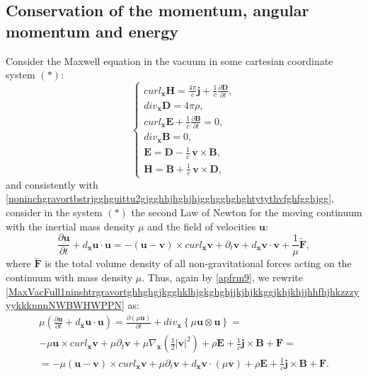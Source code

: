 \documentclass{article}
\theoremstyle{definition}
\theoremstyle{remark}
\renewcommand{\vec}[1]{\mathbf{#1}}
\newcommand{\er}{\eqref}
\newcommand{\er}{\eqref}
\begin{document}
\subsection{Conservation of the momentum, angular momentum and
energy} Consider the Maxwell equation in the vacuum in some
cartesian coordinate system $(*)$:
\begin{equation}\label{MaxVacFull1bjkgjhjhgjaaahkjhhjzzzyyykkknnnNWBWHWPPN}
\begin{cases}
curl_{\vec x} \vec H= \frac{4\pi}{c}\vec j+\frac{1}{c}\frac{\partial
\vec D}{\partial t},\\
div_{\vec x} \vec D= 4\pi\rho,\\
curl_{\vec x} \vec E+\frac{1}{c}\frac{\partial \vec B}{\partial t}=0,\\
div_{\vec x} \vec B=0,\\
\vec E=\vec D-\frac{1}{c}\,\vec v\times \vec B,\\
\vec H=\vec B+\frac{1}{c}\,\vec v\times \vec D,
\end{cases}
\end{equation}
and consistently with
\er{noninchgravortbstrjgghguittu2gjgghhjhghjhjgghgghghghtytythvfghfgghjgg},
consider in the system $(*)$ the second Law of Newton for the moving
continuum with the inertial mass density $\mu$ and the field of
velocities $\vec u$:
\begin{equation}\label{MaxVacFull1ninshtrgravortghhghgjkgghklhjgkghghjjkjhjkkggjkhjkhjjhhfhjhkzzzyyykkknnnNWBWHWPPN}
\frac{\partial\vec u}{\partial t}+d_{\vec x}\vec u\cdot \vec
u=-(\vec u-\vec v)\times curl_{\vec x}\vec v +\partial_t\vec
v+d_{\vec x}\vec v\cdot \vec v+\frac{1}{\mu}\tilde{\vec F},
\end{equation}
where $\tilde{\vec F}$ is the total volume density of all
non-gravitational forces acting on the continuum with mass density
$\mu$. Thus, again by \er{apfrm9}, we rewrite
\er{MaxVacFull1ninshtrgravortghhghgjkgghklhjgkghghjjkjhjkkggjkhjkhjjhhfhjhkzzzyyykkknnnNWBWHWPPN}
as:
\begin{multline}\label{MaxVacFull1ninshtrgravortghhghgjkgghklhjgkghghjjkjhjkkggjkhjkhjjhhfhjhkjkhbbgjhzzzyyykkknnnNWBWHWPPN}
\mu\left(\frac{\partial\vec u}{\partial t}+d_{\vec x}\vec u\cdot
\vec u\right)=\frac{\partial(\mu\vec u)}{\partial t}+div_{\vec
x}\left\{\mu\vec u\otimes\vec u\right\}=\\-\mu\vec u\times
curl_{\vec x}\vec v+\mu\partial_{t}\vec
v+\mu\nabla_{\vec x}\left(\frac{1}{2}|\vec v|^2\right)+\rho\vec E+\frac{1}{c}\vec j\times\vec B+\vec F=\\
=-\mu(\vec u-\vec v)\times curl_{\vec x}\vec v +\mu\partial_t\vec v+
d_{\vec x}\vec v\cdot (\mu\vec v)+\rho\vec E+\frac{1}{c}\vec
j\times\vec B+\vec F.
\end{multline}
\end{document}
